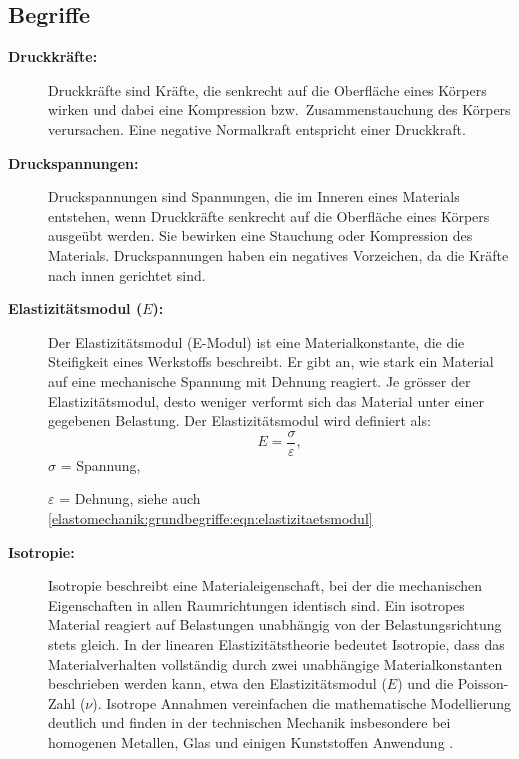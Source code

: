 \subsection{Begriffe}
\begin{description}
\item[\textbf{Druckkräfte:}] Druckkräfte sind Kräfte, die senkrecht
%
auf die Oberfläche eines Körpers wirken und dabei eine Kompression
bzw.~Zusammenstauchung des Körpers verursachen.
Eine negative Normalkraft entspricht einer Druckkraft.
	
\item[\textbf{Druckspannungen:}] Druckspannungen sind Spannungen,
%
die im Inneren eines Materials entstehen, wenn Druckkräfte senkrecht
auf die Oberfläche eines Körpers ausgeübt werden.
Sie bewirken eine Stauchung oder Kompression des Materials.
%
%
Druckspannungen haben ein negatives Vorzeichen, da die Kräfte nach
innen gerichtet sind.
	
\item[\textbf{Elastizitätsmodul ($E$):}] Der Elastizitätsmodul
(E-Modul) ist eine Materialkonstante, die die Steifigkeit eines
Werkstoffs beschreibt.
%
%
Er gibt an, wie stark ein Material auf eine mechanische Spannung
mit Dehnung reagiert.
Je grösser der Elastizitätsmodul, desto weniger verformt sich das
Material unter einer gegebenen Belastung.
Der Elastizitätsmodul wird definiert als:
	\begin{equation}
		E=
		\frac{\sigma}{\varepsilon},
		\label{elastomechanik:grundbegriffe:eqn:elastizitaetsmodul}
	\end{equation}
	$\sigma$ = Spannung,
	
	$\varepsilon$ = Dehnung, siehe auch \eqref{elastomechanik:grundbegriffe:eqn:elastizitaetsmodul}
	
\item[\textbf{Isotropie:}] Isotropie beschreibt eine Materialeigenschaft,
bei der die mechanischen Eigenschaften in allen Raumrichtungen
identisch sind.
%
Ein isotropes Material reagiert auf Belastungen unabhängig von der
Belastungsrichtung stets gleich.
%
In der linearen Elastizitätstheorie bedeutet Isotropie, dass das
Materialverhalten vollständig durch zwei unabhängige Materialkonstanten
%
beschrieben werden kann, etwa den Elastizitätsmodul ($E$) und die
Poisson-Zahl ($\nu$).
%
Isotrope Annahmen vereinfachen die mathematische Modellierung
deutlich und finden in der technischen Mechanik insbesondere bei
homogenen Metallen, Glas und einigen Kunststoffen Anwendung
\cite{elastomechanik:Isotropie}.
%
%
%
	

\end{description}
